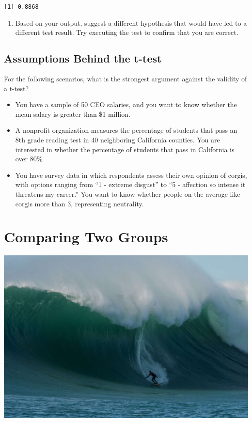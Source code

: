 \documentclass[
  letterpaper,
  DIV=11,
  numbers=noendperiod]{scrreprt}
\providecommand{\tightlist}{%
  \setlength{\itemsep}{0pt}\setlength{\parskip}{0pt}}\usepackage{longtable,booktabs,array}
\begin{document}
\begin{verbatim}
[1] 0.8868
\end{verbatim}

\begin{enumerate}
\def\labelenumi{\arabic{enumi}.}
\setcounter{enumi}{3}
\tightlist
\item
  Based on your output, suggest a different hypothesis that would have
  led to a different test result. Try executing the test to confirm that
  you are correct.
\end{enumerate}

\section{Assumptions Behind the
t-test}\label{assumptions-behind-the-t-test}

For the following scenarios, what is the strongest argument against the
validity of a t-test?

\begin{itemize}
\item
  You have a sample of 50 CEO salaries, and you want to know whether the
  mean salary is greater than \$1 million.
\item
  A nonprofit organization measures the percentage of students that pass
  an 8th grade reading test in 40 neighboring California counties. You
  are interested in whether the percentage of students that pass in
  California is over 80\%
\item
  You have survey data in which respondents assess their own opinion of
  corgis, with options ranging from ``1 - extreme disgust'' to ``5 -
  affection so intense it threatens my career.'' You want to know
  whether people on the average like corgis more than 3, representing
  neutrality.
\end{itemize}

\chapter{Comparing Two Groups}\label{comparing-two-groups}

\includegraphics{./images/goin_left.jpeg}
\end{document}
